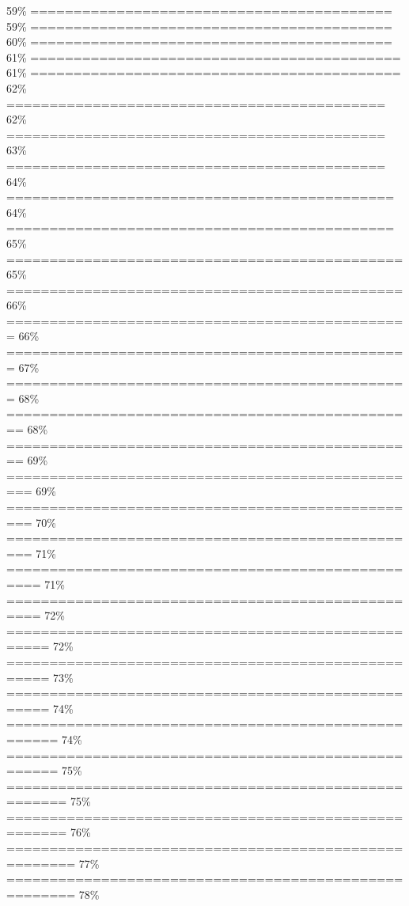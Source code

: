 \documentclass[
]{article}
\begin{document}
\textbar{} 59\% \textbar{}
\textbar========================================== \textbar{} 59\%
\textbar{} \textbar========================================== \textbar{}
60\% \textbar{} \textbar==========================================
\textbar{} 61\% \textbar{}
\textbar=========================================== \textbar{} 61\%
\textbar{} \textbar===========================================
\textbar{} 62\% \textbar{}
\textbar============================================ \textbar{} 62\%
\textbar{} \textbar============================================
\textbar{} 63\% \textbar{}
\textbar============================================ \textbar{} 64\%
\textbar{} \textbar=============================================
\textbar{} 64\% \textbar{}
\textbar============================================= \textbar{} 65\%
\textbar{} \textbar==============================================
\textbar{} 65\% \textbar{}
\textbar============================================== \textbar{} 66\%
\textbar{} \textbar===============================================
\textbar{} 66\% \textbar{}
\textbar=============================================== \textbar{} 67\%
\textbar{} \textbar===============================================
\textbar{} 68\% \textbar{}
\textbar================================================ \textbar{} 68\%
\textbar{} \textbar================================================
\textbar{} 69\% \textbar{}
\textbar================================================= \textbar{}
69\% \textbar{}
\textbar================================================= \textbar{}
70\% \textbar{}
\textbar================================================= \textbar{}
71\% \textbar{}
\textbar================================================== \textbar{}
71\% \textbar{}
\textbar================================================== \textbar{}
72\% \textbar{}
\textbar=================================================== \textbar{}
72\% \textbar{}
\textbar=================================================== \textbar{}
73\% \textbar{}
\textbar=================================================== \textbar{}
74\% \textbar{}
\textbar==================================================== \textbar{}
74\% \textbar{}
\textbar==================================================== \textbar{}
75\% \textbar{}
\textbar===================================================== \textbar{}
75\% \textbar{}
\textbar===================================================== \textbar{}
76\% \textbar{}
\textbar======================================================
\textbar{} 77\% \textbar{}
\textbar======================================================
\textbar{} 78\% \textbar{}
\end{document}
